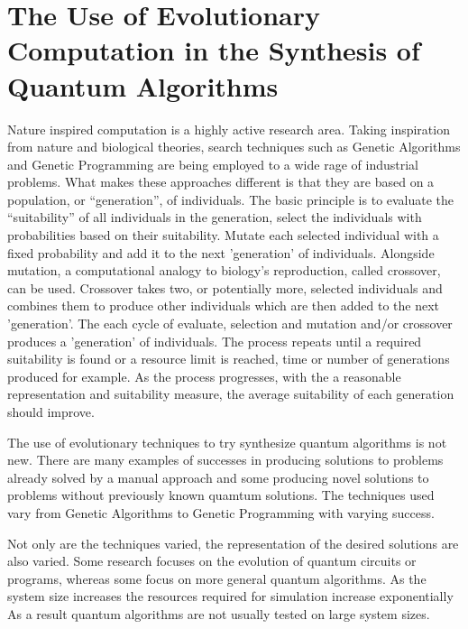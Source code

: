 % 
% 	
% 
%  
% 	
% 	

\section{The Use of Evolutionary Computation in the Synthesis of Quantum Algorithms}
Nature inspired computation is a highly active research area.
Taking inspiration from nature and biological theories, search techniques such as Genetic Algorithms and Genetic Programming are being employed to a wide rage of industrial problems.
What makes these approaches different is that they are based on a population, or ``generation'', of individuals.
The basic principle is to evaluate the ``suitability'' of all individuals in the generation, select the individuals with probabilities based on their suitability.
Mutate each selected individual with a fixed probability and add it to the next 'generation' of individuals.
Alongside mutation, a computational analogy to biology's reproduction, called crossover, can be used.
Crossover takes two, or potentially more, selected individuals and combines them to produce other individuals which are then added to the next 'generation'.
The each cycle of evaluate, selection and mutation and/or crossover produces a 'generation' of individuals.
The process repeats until a required suitability is found or a resource limit is reached, time or number of generations produced for example.
As the process progresses, with the a reasonable representation and suitability measure, the average suitability of each generation should improve.

The use of evolutionary techniques to try synthesize quantum algorithms is not new.
There are many examples of successes in producing solutions to problems already solved by a manual approach and some producing novel solutions to problems without previously known quamtum solutions.
The techniques used vary from Genetic Algorithms to Genetic Programming with varying success.

Not only are the techniques varied, the representation of the desired solutions are also varied.
Some research focuses on the evolution of quantum circuits or programs, whereas some focus on more general quantum algorithms.
As the system size increases the resources required for simulation increase exponentially
As a result quantum algorithms are not usually tested on large system sizes.

